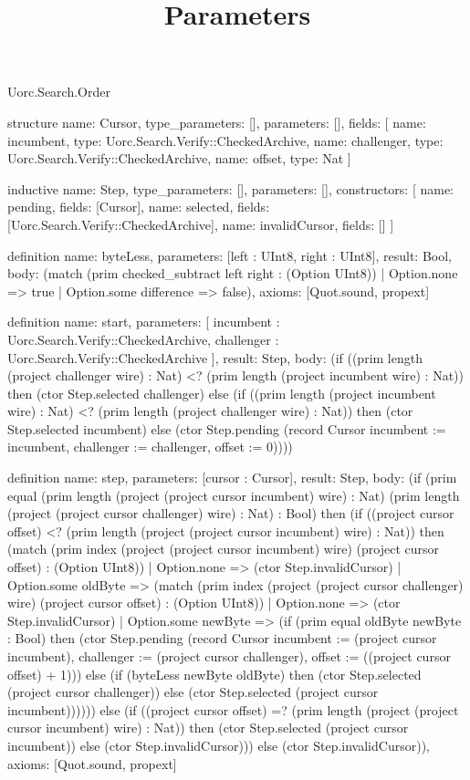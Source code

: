 \begin{lexlean}{Uorc.Search.Order}
\title{Parameters}
\begin{semanticmodule}
structure{
  name: Cursor,
  type_parameters: [],
  parameters: [],
  fields: [
    {name: incumbent, type: Uorc.Search.Verify::CheckedArchive},
    {name: challenger, type: Uorc.Search.Verify::CheckedArchive},
    {name: offset, type: Nat}
  ]
}

inductive{
  name: Step,
  type_parameters: [],
  parameters: [],
  constructors: [
    {name: pending, fields: [Cursor]},
    {name: selected, fields: [Uorc.Search.Verify::CheckedArchive]},
    {name: invalidCursor, fields: []}
  ]
}

definition{
  name: byteLess,
  parameters: [left : UInt8, right : UInt8],
  result: Bool,
  body: (match (prim checked_subtract left right : (Option UInt8))
    | Option.none => true
    | Option.some difference => false),
  axioms: [Quot.sound, propext]
}

definition{
  name: start,
  parameters: [
    incumbent : Uorc.Search.Verify::CheckedArchive,
    challenger : Uorc.Search.Verify::CheckedArchive
  ],
  result: Step,
  body: (if ((prim length (project challenger wire) : Nat) <? (prim length (project incumbent wire) : Nat)) then (ctor Step.selected challenger) else (if ((prim length (project incumbent wire) : Nat) <? (prim length (project challenger wire) : Nat)) then (ctor Step.selected incumbent) else (ctor Step.pending (record Cursor {incumbent := incumbent, challenger := challenger, offset := 0}))))
}

definition{
  name: step,
  parameters: [cursor : Cursor],
  result: Step,
  body: (if (prim equal (prim length (project (project cursor incumbent) wire) : Nat) (prim length (project (project cursor challenger) wire) : Nat) : Bool) then (if ((project cursor offset) <? (prim length (project (project cursor incumbent) wire) : Nat)) then (match (prim index (project (project cursor incumbent) wire) (project cursor offset) : (Option UInt8))
    | Option.none => (ctor Step.invalidCursor)
    | Option.some oldByte => (match (prim index (project (project cursor challenger) wire) (project cursor offset) : (Option UInt8))
      | Option.none => (ctor Step.invalidCursor)
      | Option.some newByte => (if (prim equal oldByte newByte : Bool) then (ctor Step.pending (record Cursor {incumbent := (project cursor incumbent), challenger := (project cursor challenger), offset := ((project cursor offset) + 1)})) else (if (byteLess newByte oldByte) then (ctor Step.selected (project cursor challenger)) else (ctor Step.selected (project cursor incumbent)))))) else (if ((project cursor offset) =? (prim length (project (project cursor incumbent) wire) : Nat)) then (ctor Step.selected (project cursor incumbent)) else (ctor Step.invalidCursor))) else (ctor Step.invalidCursor)),
  axioms: [Quot.sound, propext]
}


\end{semanticmodule}
\end{lexlean}
